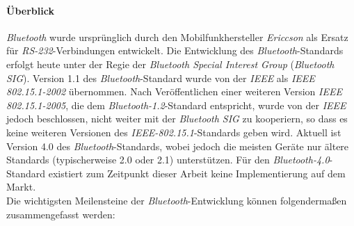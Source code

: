             \paragraph{Überblick}
                \emph{Bluetooth} wurde ursprünglich durch den Mobilfunkhersteller \emph{Ericcson} als Ersatz für
                \emph{RS-232}-Verbindungen entwickelt. Die Entwicklung des \emph{Bluetooth}-Standards erfolgt
                heute unter der Regie der \emph{Bluetooth Special Interest Group} (\emph{Bluetooth SIG}).
                Version 1.1 des \emph{Bluetooth}-Standard wurde 
                von der \emph{IEEE} als \emph{IEEE 802.15.1-2002} übernommen. Nach Veröffentlichen einer
                weiteren Version \emph{IEEE 802.15.1-2005}, die dem \emph{Bluetooth-1.2}-Standard entspricht,
                wurde von der \emph{IEEE} jedoch beschlossen, nicht weiter mit der \emph{Bluetooth SIG}
                zu kooperiern, so dass es keine weiteren Versionen des \emph{IEEE-802.15.1}-Standards 
                geben wird. Aktuell ist Version 4.0 des \emph{Bluetooth}-Standards, wobei jedoch die
                meisten Geräte nur ältere Standards (typischerweise 2.0 oder 2.1) unterstützen.
                Für den \emph{Bluetooth-4.0}-Standard existiert zum Zeitpunkt dieser Arbeit keine 
                Implementierung auf dem Markt.\\
                Die wichtigsten Meilensteine der \emph{Bluetooth}-Entwicklung können folgendermaßen
                zusammengefasst werden:


